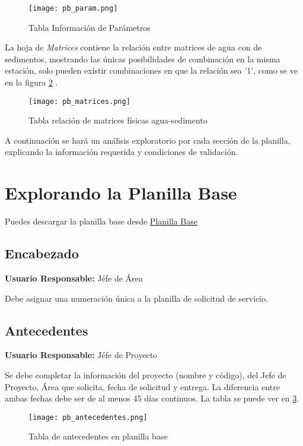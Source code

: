 \begin{figure}
	\centering
	\texttt{[image: pb\_param.png]}
	\caption{Tabla Información de Parámetros}
	\label{pb_param}
\end{figure}

La hoja de \textit{Matrices} contiene la relación entre matrices de agua con de sedimentos, mostrando las únicas posibilidades de combinación en la misma estación, solo pueden existir combinaciones en que la relación sea '1', como se ve en la figura \ref{pb_matrices} .

\begin{figure}
	\centering
	\texttt{[image: pb\_matrices.png]}
	\caption{Tabla relación de matrices físicas agua-sedimento}
	\label{pb_matrices}
\end{figure}

A continuación se hará un análisis exploratorio por cada sección de la planilla, explicando la información requerida y condiciones de validación.

\section{Explorando la Planilla Base}

Puedes descargar la planilla base desde \href{http://www.mediafire.com/view/levr2xh9bytaki2/Patron_FL.xlsx}{Planilla Base}

\subsection{Encabezado}

\textbf{Usuario Responsable:} Jéfe de Área

Debe asignar una numeración única a la planilla de solicitud de servicio.

\subsection{Antecedentes}

\textbf{Usuario Responsable:} Jéfe de Proyecto

Se debe completar la información del proyecto (nombre y código), del Jefe de Proyecto, Área que solicita, fecha de solicitud y entrega. La diferencia entre ambas fechas debe ser de al menos 45 días continuos. La tabla se puede ver en \ref{pb_antecedentes}.

\begin{figure}
	\centering
	\texttt{[image: pb\_antecedentes.png]}
	\caption{Tabla de antecedentes en planilla base}
	\label{pb_antecedentes}
\end{figure}
 
